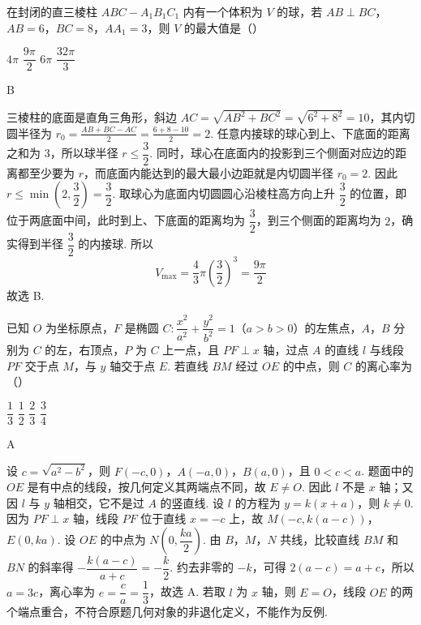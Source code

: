 \begin{problem}
在封闭的直三棱柱 \(ABC-A_1B_1C_1\) 内有一个体积为 \(V\) 的球，若 \(AB\perp BC\)，\(AB=6\)，\(BC=8\)，\(AA_1=3\)，则 \(V\) 的最大值是（\quad）

\choices
    {\(4\pi\)}
    {\(\dfrac{9\pi}{2}\)}
    {\(6\pi\)}
    {\(\dfrac{32\pi}{3}\)}
\end{problem}

\begin{answer}
B
\end{answer}

\begin{solution}
三棱柱的底面是直角三角形，斜边
\(AC=\sqrt{AB^2+BC^2}=\sqrt{6^2+8^2}=10\)，其内切圆半径为
\(r_0=\frac{AB+BC-AC}{2}=\frac{6+8-10}{2}=2\).
任意内接球的球心到上、下底面的距离之和为 \(3\)，所以球半径 \(r\le\dfrac32\). 同时，球心在底面内的投影到三个侧面对应边的距离都至少要为 \(r\)，而底面内能达到的最大最小边距就是内切圆半径 \(r_0=2\). 因此 \(r\le\min\left(2,\dfrac32\right)=\dfrac32\). 取球心为底面内切圆圆心沿棱柱高方向上升 \(\dfrac32\) 的位置，即位于两底面中间，此时到上、下底面的距离均为 \(\dfrac32\)，到三个侧面的距离均为 \(2\)，确实得到半径 \(\dfrac32\) 的内接球. 所以
\[
V_{\max}=\frac43\pi\left(\frac32\right)^3=\frac{9\pi}{2}
\]
故选 B.
\end{solution}

\begin{problem}
已知 \(O\) 为坐标原点，\(F\) 是椭圆 \(C:\dfrac{x^2}{a^2}+\dfrac{y^2}{b^2}=1\)（\(a>b>0\)）的左焦点，\(A\)，\(B\) 分别为 \(C\) 的左，右顶点，\(P\) 为 \(C\) 上一点，且 \(PF\perp x\) 轴，过点 \(A\) 的直线 \(l\) 与线段 \(PF\) 交于点 \(M\)，与 \(y\) 轴交于点 \(E\). 若直线 \(BM\) 经过 \(OE\) 的中点，则 \(C\) 的离心率为（\quad）

\choices
    {\(\dfrac13\)}
    {\(\dfrac12\)}
    {\(\dfrac23\)}
    {\(\dfrac34\)}
\end{problem}

\begin{answer}
A
\end{answer}

\begin{solution}
设 \(c=\sqrt{a^2-b^2}\)，则 \(F(-c,0)\)，\(A(-a,0)\)，\(B(a,0)\)，且 \(0<c<a\). 题面中的 \(OE\) 是有中点的线段，按几何定义其两端点不同，故 \(E\ne O\). 因此 \(l\) 不是 \(x\) 轴；又因 \(l\) 与 \(y\) 轴相交，它不是过 \(A\) 的竖直线. 设 \(l\) 的方程为 \(y=k\left(x+a\right)\)，则 \(k\ne0\). 因为 \(PF\perp x\) 轴，线段 \(PF\) 位于直线 \(x=-c\) 上，故 \(M\left(-c,k\left(a-c\right)\right)\)，\(E(0,ka)\). 设 \(OE\) 的中点为 \(N\left(0,\dfrac{ka}{2}\right)\). 由 \(B\)，\(M\)，\(N\) 共线，比较直线 \(BM\) 和 \(BN\) 的斜率得 \(-\dfrac{k\left(a-c\right)}{a+c}=-\dfrac{k}{2}\). 约去非零的 \(-k\)，可得 \(2\left(a-c\right)=a+c\)，所以 \(a=3c\)，离心率为 \(e=\dfrac ca=\dfrac13\)，故选 A. 若取 \(l\) 为 \(x\) 轴，则 \(E=O\)，线段 \(OE\) 的两个端点重合，不符合原题几何对象的非退化定义，不能作为反例.
\end{solution}

